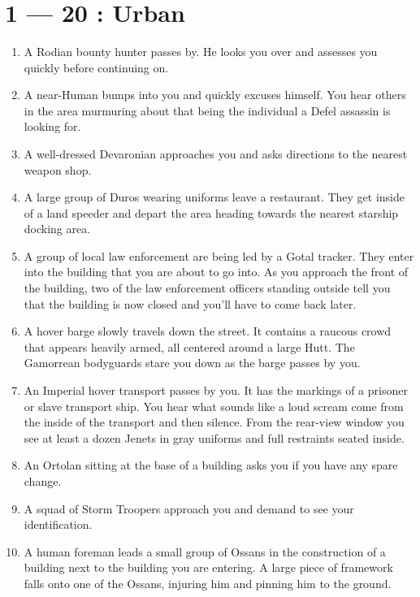\documentclass{article}
\begin{document}
\title{\vspace{-0.5cm}{\Huge Encounter Ideas} \vspace{-1cm}}

\date{}

\maketitle

\section*{1 --- 20 : Urban}
\begin{enumerate}
	\item A Rodian bounty hunter passes by. He looks you over and assesses you quickly before continuing on.
	\item A near-Human bumps into you and quickly excuses himself. You hear others in the area murmuring about that being the individual a Defel assassin is looking for.
	\item A well-dressed Devaronian approaches you and asks directions to the nearest weapon shop.
	\item A large group of Duros wearing uniforms leave a restaurant. They get inside of a land speeder and depart the area heading towards the nearest starship docking area.
	\item A group of local law enforcement are being led by a Gotal tracker. They enter into the building that you are about to go into. As you approach the front of the building, two of the law enforcement officers standing outside tell you that the building is now closed and you’ll have to come back later.
	\item A hover barge slowly travels down the street. It contains a raucous crowd that appears heavily armed, all centered around a large Hutt. The Gamorrean bodyguards stare you down as the barge passes by you.
	\item An Imperial hover transport passes by you. It has the markings of a prisoner or slave transport ship. You hear what sounds like a loud scream come from the inside of the transport and then silence. From the rear-view window you see at least a dozen Jenets in gray uniforms and full restraints seated inside.
	\item An Ortolan sitting at the base of a building asks you if you have any spare change.
	\item A squad of Storm Troopers approach you and demand to see your identification.
	\item A human foreman leads a small group of Ossans in the construction of a building next to the building you are entering. A large piece of framework falls onto one of the Ossans, injuring him and pinning him to the ground.

\end{enumerate}
\end{document}
